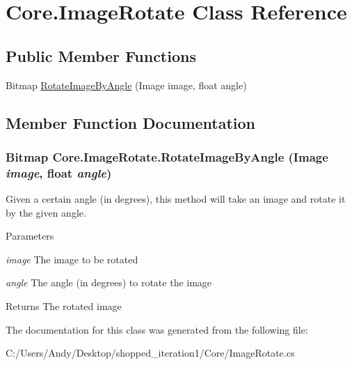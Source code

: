 \hypertarget{class_core_1_1_image_rotate}{
\section{Core.ImageRotate Class Reference}
\label{class_core_1_1_image_rotate}
}
\subsection*{Public Member Functions}
\begin{DoxyCompactItemize}
\item 
Bitmap \hyperlink{class_core_1_1_image_rotate_afb29109d626ece8b64706820878380b4}{RotateImageByAngle} (Image image, float angle)
\end{DoxyCompactItemize}


\subsection{Member Function Documentation}
\hypertarget{class_core_1_1_image_rotate_afb29109d626ece8b64706820878380b4}{
\subsubsection[{RotateImageByAngle}]{\setlength{\rightskip}{0pt plus 5cm}Bitmap Core.ImageRotate.RotateImageByAngle (Image {\em image}, \/  float {\em angle})}}
\label{class_core_1_1_image_rotate_afb29109d626ece8b64706820878380b4}
Given a certain angle (in degrees), this method will take an image and rotate it by the given angle.


\begin{DoxyParams}{Parameters}
\item[{\em image}]The image to be rotated \item[{\em angle}]The angle (in degrees) to rotate the image \end{DoxyParams}
\begin{DoxyReturn}{Returns}
The rotated image 
\end{DoxyReturn}


The documentation for this class was generated from the following file:\begin{DoxyCompactItemize}
\item 
C:/Users/Andy/Desktop/shopped\_\-iteration1/Core/ImageRotate.cs\end{DoxyCompactItemize}
